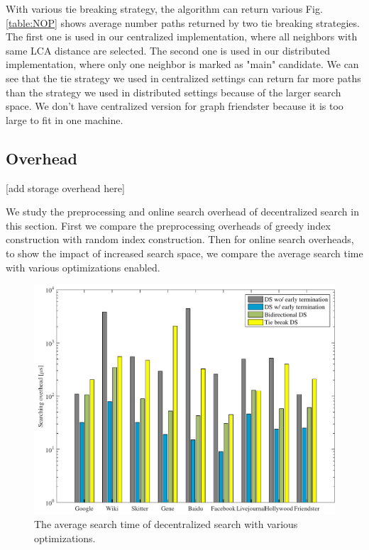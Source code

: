 With various tie breaking strategy, the algorithm can return various  Fig. \ref{table:NOP} shows average number paths returned by two tie breaking strategies. The first one is used in our centralized implementation, where all neighbors with same LCA distance are selected. The second one is used in our distributed implementation, where only one neighbor is marked as "main" candidate. We can see that the tie strategy we used in centralized settings can return far more paths than the strategy we used in distributed settings because of the larger search space. We don't have centralized version for graph friendster because it is too large to fit in one machine.

\subsection{Overhead}
\label{eval_overhead}

[add storage overhead here]

We study the preprocessing and online search overhead of decentralized search in this section. First we compare the preprocessing overheads of greedy index construction with random index construction. Then for online search overheads, to show the impact of increased search space, we compare the average search time with various optimizations enabled. 

\begin{figure}[t]
    \centering
    \includegraphics[width=\linewidth]{./figures/overhead_search.pdf}
    \caption{The average search time of decentralized search with various optimizations.}
    \label{fig:overhead_search}
\end{figure}

